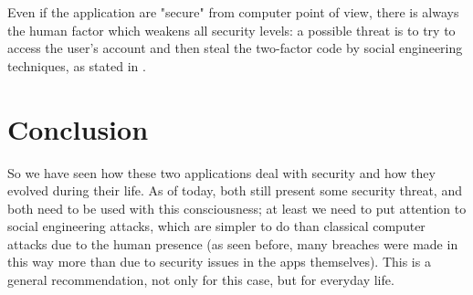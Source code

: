 \documentclass{article}
\begin{document}
Even if the application are "secure" from computer point of view, there is always the human factor which weakens all security levels: a possible threat is to try to access the user's account and then steal the two-factor code by social engineering techniques, as stated in \cite{6ditigs_hack}.


\section{Conclusion}

So we have seen how these two applications deal with security and how they evolved during their life. As of today, both still present some security threat, and both need to be used with this consciousness; at least we need to put attention to social engineering attacks, which are simpler to do than classical computer attacks due to the human presence (as seen before, many breaches were made in this way more than due to security issues in the apps themselves). This is a general recommendation, not only for this case, but for everyday life.






\end{document}
